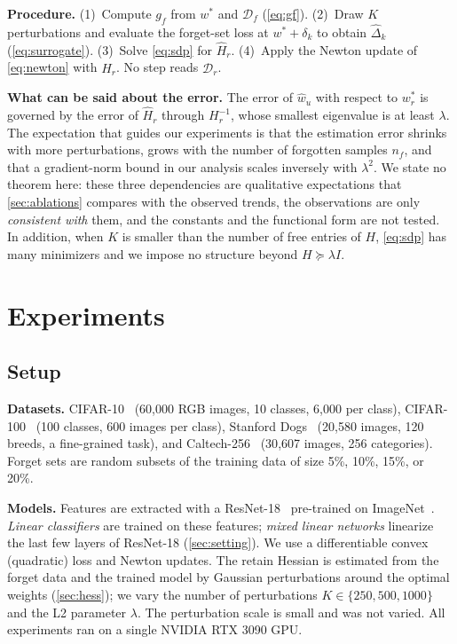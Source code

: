 \documentclass[10pt,twocolumn,letterpaper]{article}
\begin{document}
\noindent\textbf{Procedure.} (1)~Compute $g_f$ from $w^*$ and $\mathcal D_f$ (\cref{eq:gf}). (2)~Draw $K$ perturbations and evaluate the forget-set loss at $w^*+\delta_k$ to obtain $\hat\Delta_k$ (\cref{eq:surrogate}). (3)~Solve \cref{eq:sdp} for $\widehat H_r$. (4)~Apply the Newton update of \cref{eq:newton} with $\widehat H_r$. No step reads $\mathcal D_r$.

\noindent\textbf{What can be said about the error.} The error of $\hat w_u$ with respect to $w^*_r$ is governed by the error of $\widehat H_r$ through $H_r^{-1}$, whose smallest eigenvalue is at least $\lambda$. The expectation that guides our experiments is that the estimation error shrinks with more perturbations, grows with the number of forgotten samples $n_f$, and that a gradient-norm bound in our analysis scales inversely with $\lambda^2$. We state no theorem here: these three dependencies are qualitative expectations that \cref{sec:ablations} compares with the observed trends, the observations are only \emph{consistent with} them, and the constants and the functional form are not tested. In addition, when $K$ is smaller than the number of free entries of $H$, \cref{eq:sdp} has many minimizers and we impose no structure beyond $H\succeq\lambda I$.

\section{Experiments}
\label{sec:experiments}
\subsection{Setup}
\label{sec:setup}
\noindent\textbf{Datasets.} CIFAR-10~\cite{krizhevsky2009learning} (60{,}000 RGB images, 10 classes, 6{,}000 per class), CIFAR-100~\cite{krizhevsky2009learning} (100 classes, 600 images per class), Stanford Dogs~\cite{khosla2011novel} (20{,}580 images, 120 breeds, a fine-grained task), and Caltech-256~\cite{griffin2007caltech} (30{,}607 images, 256 categories). Forget sets are random subsets of the training data of size 5\%, 10\%, 15\%, or 20\%.

\noindent\textbf{Models.} Features are extracted with a ResNet-18~\cite{he2016deep} pre-trained on ImageNet~\cite{deng2009imagenet}. \emph{Linear classifiers} are trained on these features; \emph{mixed linear networks} linearize the last few layers of ResNet-18 (\cref{sec:setting}). We use a differentiable convex (quadratic) loss and Newton updates. The retain Hessian is estimated from the forget data and the trained model by Gaussian perturbations around the optimal weights (\cref{sec:hess}); we vary the number of perturbations $K\in\{250,500,1000\}$ and the L2 parameter $\lambda$. The perturbation scale is small and was not varied. All experiments ran on a single NVIDIA RTX 3090 GPU.
\end{document}
